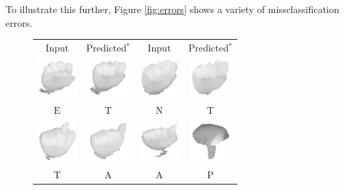 \documentclass[a4paper]{article}
\begin{document}
To illustrate this further, Figure \ref{fig:errors} shows a variety of
missclassification errors. 
\begin{figure}
\centering
\begin{tabular}{cccc}
Input & Predicted$^*$ & Input & Predicted$^*$ \\

\includegraphics[width=1.5cm]{img/S01_C14_0186.eps} & 
\includegraphics[width=1.5cm]{img/S01_C28_0015.eps} &  
\includegraphics[width=1.5cm]{img/S01_C22_0139.eps} & 
\includegraphics[width=1.5cm]{img/S01_C28_0142.eps} \\ 
$\text{E}$ & $\text{T}$ & $\text{N}$ & $\text{T}$ \\

\includegraphics[width=1.5cm]{img/S02_C28_0199.eps} & 
\includegraphics[width=1.5cm]{img/S02_C10_0146.eps} & 
\includegraphics[width=1.5cm]{img/S03_C10_0138.eps} & 
\includegraphics[width=1.5cm]{img/S03_C24_0055.eps} \\
$\text{T}$ & $\text{A}$ & $\text{A}$ & $\text{P}$ \\


\end{tabular}
\end{figure}
\end{document}
